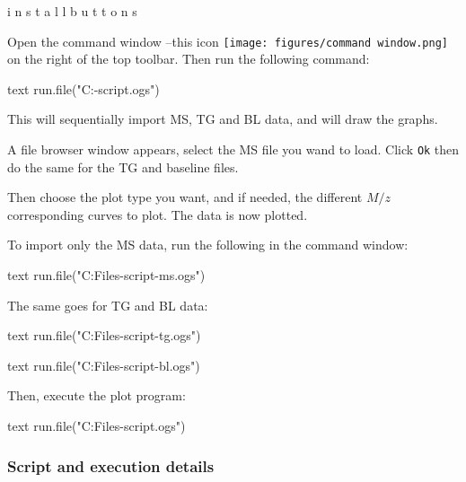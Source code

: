 \documentclass[a4paper, 11pt, raggedright, parskip]{tufte-style-article}
\begin{document}

i n s t a l l   b u t t o n s

Open the command window --this icon \texttt{[image: figures/command window.png]} on the right of the top toolbar. Then run the following command:

\begin{codebox}{text}
run.file("C:\ProgramFiles{}\tgmsplot-script\main.ogs")
\end{codebox}

This will sequentially import MS, TG and BL data, and will draw the graphs.

A file browser window appears, select the MS file you wand to load. Click \texttt{Ok} then do the same for the TG and baseline files.

Then choose the plot type you want, and if needed, the different $M/z$ corresponding curves to plot. The data is now plotted.

To import only the MS data, run the following in the command window:
\begin{codebox}{text}
run.file("C:\Program Files\tgmsplot-script-ms.ogs")
\end{codebox}
The same goes for TG and BL data:
\begin{codebox}{text}
run.file("C:\Program Files\tgmsplot-script-tg.ogs")
\end{codebox}
\begin{codebox}{text}
run.file("C:\Program Files\tgmsplot-script-bl.ogs")
\end{codebox}
Then, execute the plot program:
\begin{codebox}{text}
run.file("C:\Program Files\tgmsplot-script\plot.ogs")
\end{codebox}

\subsubsection{Script and execution details}
\end{document}
